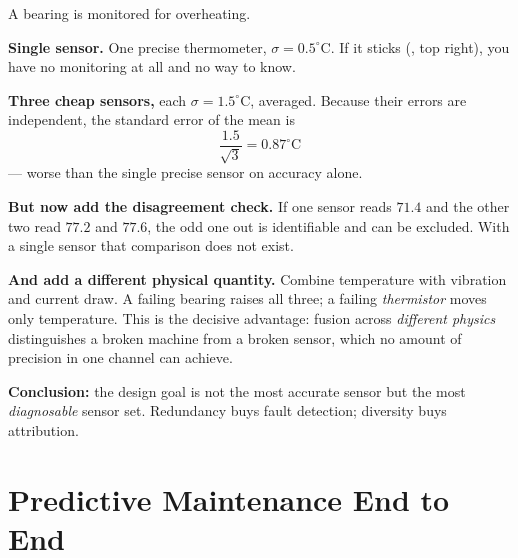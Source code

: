 \begin{worked}
A bearing is monitored for overheating.

\smallskip
\textbf{Single sensor.} One precise thermometer, $\sigma = 0.5^\circ$C. If it
sticks (, top right), you have no monitoring at all and
no way to know.

\textbf{Three cheap sensors,} each $\sigma = 1.5^\circ$C, averaged. Because their
errors are independent, the standard error of the mean is
\[
\frac{1.5}{\sqrt{3}} = 0.87^\circ\text{C}
\]
--- worse than the single precise sensor on accuracy alone.

\smallskip
\textbf{But now add the disagreement check.} If one sensor reads $71.4$ and the
other two read $77.2$ and $77.6$, the odd one out is identifiable and can be
excluded. With a single sensor that comparison does not exist.

\smallskip
\textbf{And add a different physical quantity.} Combine temperature with vibration
and current draw. A failing bearing raises all three; a failing \emph{thermistor}
moves only temperature. This is the decisive advantage: fusion across
\emph{different physics} distinguishes a broken machine from a broken sensor, which
no amount of precision in one channel can achieve.

\smallskip
\textbf{Conclusion:} the design goal is not the most accurate sensor but the most
\emph{diagnosable} sensor set. Redundancy buys fault detection; diversity buys
attribution.
\end{worked}

\section{Predictive Maintenance End to End}

